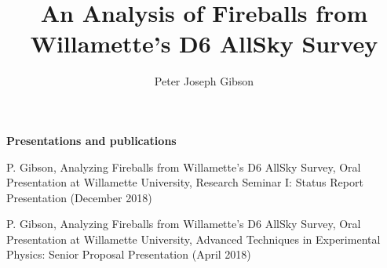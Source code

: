 \documentclass[12pt]{report}
\begin{document}
\title{An Analysis of Fireballs from Willamette's D6 AllSky Survey}
\author{Peter Joseph Gibson}

\maketitle


\newpage

\begin{center}
\textbf{Presentations and publications}

P. Gibson, Analyzing Fireballs from Willamette's D6 AllSky Survey, Oral Presentation at Willamette University, Research Seminar I: Status Report Presentation (December 2018)
\bigskip

P. Gibson, Analyzing Fireballs from Willamette's D6 AllSky Survey, Oral Presentation at Willamette University, Advanced Techniques in Experimental Physics: Senior Proposal Presentation (April 2018)

\bigskip
\end{center}



\begin{acknowledgments}

\end{acknowledgments}

\begin{abstract}

\end{abstract}

\tableofcontents
\listoffigures



%
%
%
%

%
%
%
\printbibliography

%
\end{document}
